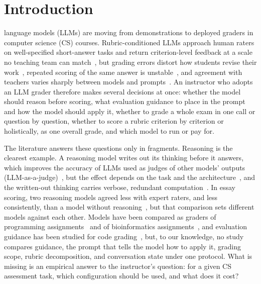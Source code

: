 
\section{Introduction}
\label{sec:intro}

 language models (LLMs) are moving from demonstrations to deployed graders in computer science
(CS) courses. Rubric-conditioned LLMs approach human raters on well-specified short-answer tasks and return
criterion-level feedback at a scale no teaching team can match~\cite{sessler_canai_2025,henkel_roars_2025}, but
grading errors distort how students revise their work~\cite{li_am_2023}, repeated scoring of the same answer is
unstable~\cite{pack_large_2024,moazzez_assessing_2024}, and agreement with teachers varies sharply between models
and prompts~\cite{tate_can_2024}. An instructor who adopts an
LLM grader therefore makes several decisions at once: whether the model should reason before scoring,
what evaluation guidance to place in the prompt and how the model should apply it, whether to grade a
whole exam in one call or question by question, whether to score a rubric criterion by criterion or
holistically, as one overall grade, and which model to run or pay for.

The literature answers these questions only in fragments. Reasoning is the clearest example. A reasoning model
writes out its thinking before it answers, which improves the accuracy of LLMs used as judges of other models'
outputs (LLM-as-a-judge)~\cite{jayarao_explicit_2025}, but the effect depends on the task and the
architecture~\cite{larionov_deepseek_2025}, and the written-out thinking carries verbose, redundant
computation~\cite{sui_stop_2025}. In essay scoring, two reasoning models agreed less with expert raters, and less
consistently, than a model without reasoning~\cite{yoshida_reasoning_2025}, but that comparison sets different
models against each other. Models have been compared as graders of programming
assignments~\cite{jukiewicz_comparison_2026} and of bioinformatics assignments~\cite{policar_automated_2025},
and evaluation guidance has been studied for code grading~\cite{pathak_rubric_2025}, but, to our knowledge, no
study compares guidance, the prompt that tells the model how to apply it, grading scope, rubric decomposition,
and conversation state under one protocol. What is missing is an empirical answer to the instructor's question:
for a given CS assessment task, which configuration should be used, and what does it cost?

